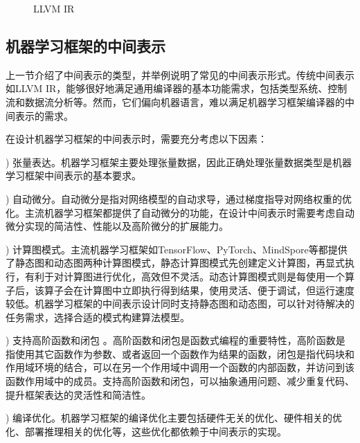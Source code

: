\documentclass[letterpaper,10pt,english]{sphinxmanual}
\let\sphinxpxdimen\pdfpxdimen\else\newdimen\sphinxpxdimen
\begin{document}
\begin{figure}[H]
\centering
\capstart

\noindent\sphinxincludegraphics[width=800\sphinxpxdimen]{{中间表示-LLVMIR}.png}
\caption{LLVM IR}\label{\detokenize{chapter_frontend_and_ir/intermediate_representation:id16}}\label{\detokenize{chapter_frontend_and_ir/intermediate_representation:llvm-ir}}\end{figure}


\subsection{机器学习框架的中间表示}
\label{\detokenize{chapter_frontend_and_ir/intermediate_representation:id8}}
\sphinxAtStartPar
上一节介绍了中间表示的类型，并举例说明了常见的中间表示形式。传统中间表示如LLVM
IR，能够很好地满足通用编译器的基本功能需求，包括类型系统、控制流和数据流分析等。然而，它们偏向机器语言，难以满足机器学习框架编译器的中间表示的需求。

\sphinxAtStartPar
在设计机器学习框架的中间表示时，需要充分考虑以下因素：

)
张量表达。机器学习框架主要处理张量数据，因此正确处理张量数据类型是机器学习框架中间表示的基本要求。

)
自动微分。自动微分是指对网络模型的自动求导，通过梯度指导对网络权重的优化。主流机器学习框架都提供了自动微分的功能，在设计中间表示时需要考虑自动微分实现的简洁性、性能以及高阶微分的扩展能力。

)
计算图模式。主流机器学习框架如TensorFlow、PyTorch、MindSpore等都提供了静态图和动态图两种计算图模式，静态计算图模式先创建定义计算图，再显式执行，有利于对计算图进行优化，高效但不灵活。动态计算图模式则是每使用一个算子后，该算子会在计算图中立即执行得到结果，使用灵活、便于调试，但运行速度较低。机器学习框架的中间表示设计同时支持静态图和动态图，可以针对待解决的任务需求，选择合适的模式构建算法模型。

) 支持高阶函数和闭包
。高阶函数和闭包是函数式编程的重要特性，高阶函数是指使用其它函数作为参数、或者返回一个函数作为结果的函数，闭包是指代码块和作用域环境的结合，可以在另一个作用域中调用一个函数的内部函数，并访问到该函数作用域中的成员。支持高阶函数和闭包，可以抽象通用问题、减少重复代码、提升框架表达的灵活性和简洁性。

)
编译优化。机器学习框架的编译优化主要包括硬件无关的优化、硬件相关的优化、部署推理相关的优化等，这些优化都依赖于中间表示的实现。
\end{document}
